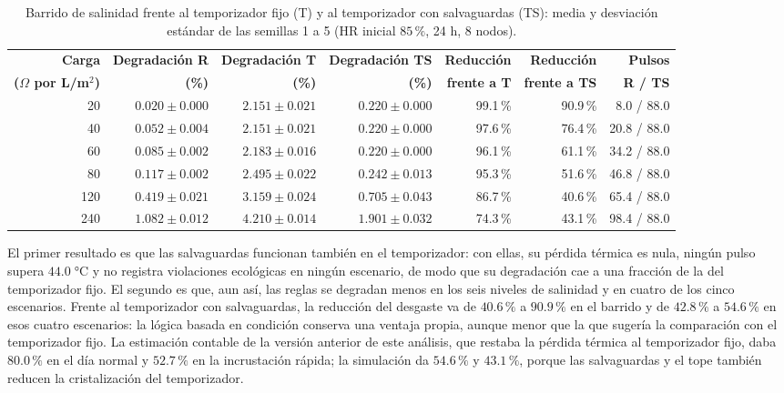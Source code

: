 \begin{table}[htbp]
\centering
\footnotesize
\setlength{\tabcolsep}{2pt}
\caption{Barrido de salinidad frente al temporizador fijo (T) y al temporizador con salvaguardas (TS): media y desviaci\'on est\'andar de las semillas 1 a 5 (HR inicial $85\,\%$, 24 h, 8 nodos).}
\label{tab:salvaguardas_barrido}
\begin{tabular*}{\textwidth}{@{\extracolsep{\fill}}rrrrrrr@{}}
\toprule
\textbf{Carga} & \textbf{Degradaci\'on R} & \textbf{Degradaci\'on T} & \textbf{Degradaci\'on TS} & \textbf{Reducci\'on} & \textbf{Reducci\'on} & \textbf{Pulsos} \\
\textbf{($\Omega$ por L/m$^2$)} & \textbf{(\%)} & \textbf{(\%)} & \textbf{(\%)} & \textbf{frente a T} & \textbf{frente a TS} & \textbf{R / TS} \\
\midrule
20 & $0.020 \pm 0.000$ & $2.151 \pm 0.021$ & $0.220 \pm 0.000$ & 99.1\,\% & 90.9\,\% & 8.0 / 88.0 \\
40 & $0.052 \pm 0.004$ & $2.151 \pm 0.021$ & $0.220 \pm 0.000$ & 97.6\,\% & 76.4\,\% & 20.8 / 88.0 \\
60 & $0.085 \pm 0.002$ & $2.183 \pm 0.016$ & $0.220 \pm 0.000$ & 96.1\,\% & 61.1\,\% & 34.2 / 88.0 \\
80 & $0.117 \pm 0.002$ & $2.495 \pm 0.022$ & $0.242 \pm 0.013$ & 95.3\,\% & 51.6\,\% & 46.8 / 88.0 \\
120 & $0.419 \pm 0.021$ & $3.159 \pm 0.024$ & $0.705 \pm 0.043$ & 86.7\,\% & 40.6\,\% & 65.4 / 88.0 \\
240 & $1.082 \pm 0.012$ & $4.210 \pm 0.014$ & $1.901 \pm 0.032$ & 74.3\,\% & 43.1\,\% & 98.4 / 88.0 \\
\bottomrule
\end{tabular*}
\end{table}

El primer resultado es que las salvaguardas funcionan tambi\'en en el temporizador: con ellas, su p\'erdida t\'ermica es nula, ning\'un pulso supera $44.0\;\si{\celsius}$ y no registra violaciones ecol\'ogicas en ning\'un escenario, de modo que su degradaci\'on cae a una fracci\'on de la del temporizador fijo. El segundo es que, aun as\'i, las reglas se degradan menos en los seis niveles de salinidad y en cuatro de los cinco escenarios. Frente al temporizador con salvaguardas, la reducci\'on del desgaste va de $40.6\,\%$ a $90.9\,\%$ en el barrido y de $42.8\,\%$ a $54.6\,\%$ en esos cuatro escenarios: la l\'ogica basada en condici\'on conserva una ventaja propia, aunque menor que la que suger\'ia la comparaci\'on con el temporizador fijo. La estimaci\'on contable de la versi\'on anterior de este an\'alisis, que restaba la p\'erdida t\'ermica al temporizador fijo, daba $80.0\,\%$ en el d\'ia normal y $52.7\,\%$ en la incrustaci\'on r\'apida; la simulaci\'on da $54.6\,\%$ y $43.1\,\%$, porque las salvaguardas y el tope tambi\'en reducen la cristalizaci\'on del temporizador.


